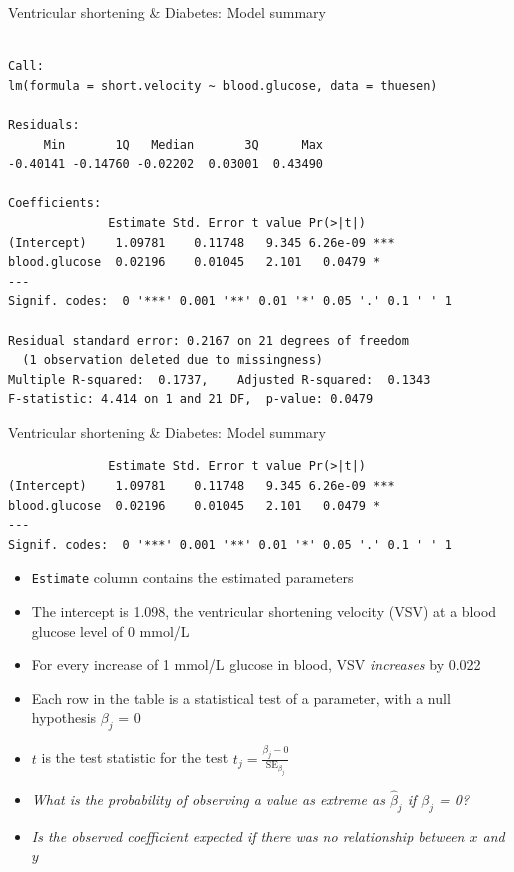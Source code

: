 \documentclass[10pt,ignorenonframetext,compress, aspectratio=169]{beamer}
\providecommand{\tightlist}{%
  \setlength{\itemsep}{0pt}\setlength{\parskip}{0pt}}
\begin{document}
\begin{frame}[fragile]{Ventricular shortening \& Diabetes: Model
summary}

\scriptsize

\begin{verbatim}

Call:
lm(formula = short.velocity ~ blood.glucose, data = thuesen)

Residuals:
     Min       1Q   Median       3Q      Max 
-0.40141 -0.14760 -0.02202  0.03001  0.43490 

Coefficients:
              Estimate Std. Error t value Pr(>|t|)    
(Intercept)    1.09781    0.11748   9.345 6.26e-09 ***
blood.glucose  0.02196    0.01045   2.101   0.0479 *  
---
Signif. codes:  0 '***' 0.001 '**' 0.01 '*' 0.05 '.' 0.1 ' ' 1

Residual standard error: 0.2167 on 21 degrees of freedom
  (1 observation deleted due to missingness)
Multiple R-squared:  0.1737,    Adjusted R-squared:  0.1343 
F-statistic: 4.414 on 1 and 21 DF,  p-value: 0.0479
\end{verbatim}

\normalsize

\end{frame}

\begin{frame}[fragile]{Ventricular shortening \& Diabetes: Model
summary}

\scriptsize

\begin{verbatim}
              Estimate Std. Error t value Pr(>|t|)    
(Intercept)    1.09781    0.11748   9.345 6.26e-09 ***
blood.glucose  0.02196    0.01045   2.101   0.0479 *  
---
Signif. codes:  0 '***' 0.001 '**' 0.01 '*' 0.05 '.' 0.1 ' ' 1
\end{verbatim}

\normalsize

\begin{itemize}
\tightlist
\item
  \texttt{Estimate} column contains the estimated parameters
\item
  The intercept is 1.098, the ventricular shortening velocity (VSV) at a
  blood glucose level of 0 mmol/L
\item
  For every increase of 1 mmol/L glucose in blood, VSV \emph{increases}
  by 0.022
\item
  Each row in the table is a statistical test of a parameter, with a
  null hypothesis \(\beta_j\) = 0
\item
  \(t\) is the \alert{test statistic} for the test
  \(t_j = \frac{\beta_j - 0}{\mathrm{SE}_{\beta_j}}\)
\item
  \emph{What is the probability of observing a value as extreme as
  \(\hat{\beta}_j\) if \(\beta_j\) = 0?}
\item
  \emph{Is the observed coefficient expected if there was no
  relationship between \(x\) and \(y\)}
\end{itemize}

\end{frame}
\end{document}
